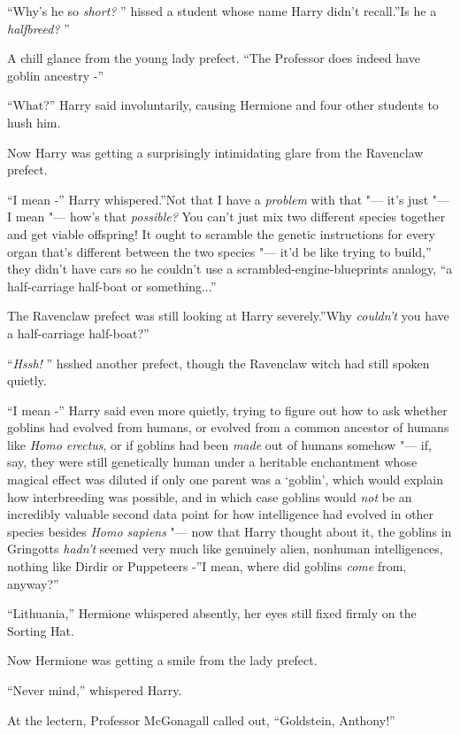 ``Why's he so \emph{short?} '' hissed a student whose name Harry didn't
recall.''Is he a \emph{halfbreed?} ''

A chill glance from the young lady prefect. ``The Professor does indeed
have goblin ancestry -''

``What?'' Harry said involuntarily, causing Hermione and four other
students to hush him.

Now Harry was getting a surprisingly intimidating glare from the
Ravenclaw prefect.

``I mean -'' Harry whispered.''Not that I have a \emph{problem} with
that "--- it's just "--- I mean "--- how's that \emph{possible?} You can't just
mix two different species together and get viable offspring! It ought to
scramble the genetic instructions for every organ that's different
between the two species "--- it'd be like trying to build,'' they didn't
have cars so he couldn't use a scrambled-engine-blueprints analogy, ``a
half-carriage half-boat or something...''

The Ravenclaw prefect was still looking at Harry severely.''Why
\emph{couldn't} you have a half-carriage half-boat?''

``\emph{Hssh!} '' hsshed another prefect, though the Ravenclaw witch had
still spoken quietly.

``I mean -'' Harry said even more quietly, trying to figure out how to
ask whether goblins had evolved from humans, or evolved from a common
ancestor of humans like \emph{Homo erectus}, or if goblins had been
\emph{made} out of humans somehow "--- if, say, they were still genetically
human under a heritable enchantment whose magical effect was diluted if
only one parent was a `goblin', which would explain how interbreeding
was possible, and in which case goblins would \emph{not} be an
incredibly valuable second data point for how intelligence had evolved
in other species besides \emph{Homo sapiens} "--- now that Harry thought
about it, the goblins in Gringotts \emph{hadn't} seemed very much like
genuinely alien, nonhuman intelligences, nothing like Dirdir or
Puppeteers -''I mean, where did goblins \emph{come} from, anyway?''

``Lithuania,'' Hermione whispered absently, her eyes still fixed firmly
on the Sorting Hat.

Now Hermione was getting a smile from the lady prefect.

``Never mind,'' whispered Harry.

At the lectern, Professor McGonagall called out, ``Goldstein, Anthony!''

